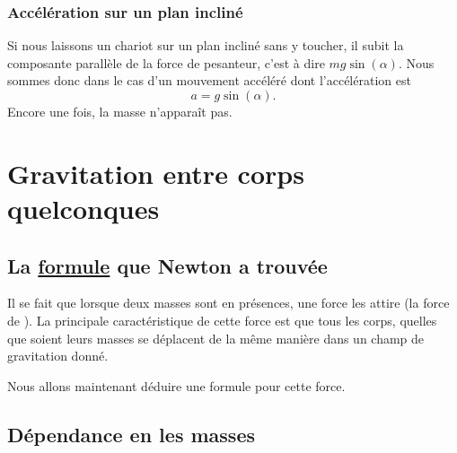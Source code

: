 \subsubsection{Accélération sur un plan incliné}

Si nous laissons un chariot sur un plan incliné sans y toucher, il subit la composante parallèle de la force de pesanteur, c'est à dire $mg\sin(\alpha)$. Nous sommes donc dans le cas d'un mouvement accéléré dont l'accélération est
\begin{equation}
	a=g\sin(\alpha).
\end{equation}
Encore une fois, la masse n'apparaît pas.

\section{Gravitation entre corps quelconques}

\subsection{La \href{http://fr.wikipedia.org/wiki/Loi_universelle_de_la_gravitation}{formule} que Newton a trouvée}

Il se fait que lorsque deux masses sont en présences, une force les attire (la force de ). La principale caractéristique de cette force est que tous les corps, quelles que soient leurs masses se déplacent de la même manière dans un champ de gravitation donné.

Nous allons maintenant déduire une formule pour cette force.

\subsection{Dépendance en les masses}


